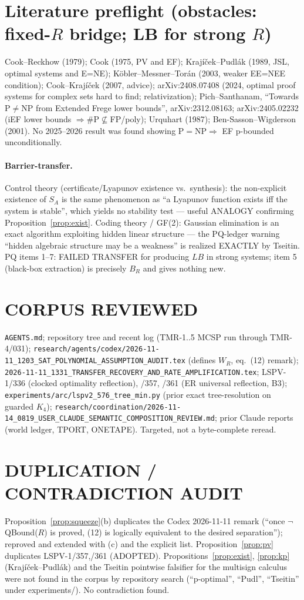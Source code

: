 \documentclass[11pt]{article}
\begin{document}
\section*{Literature preflight (obstacles: fixed-$R$ bridge; LB for strong $R$)}
Cook--Reckhow (1979); Cook (1975, PV and EF); Kraj\'i\v{c}ek--Pudl\'ak (1989, JSL, optimal systems
and E=NE); K\"obler--Messner--Tor\'an (2003, weaker EE=NEE condition); Cook--Kraj\'i\v{c}ek (2007, advice);
arXiv:2408.07408 (2024, optimal proof systems for complex sets hard to find; relativization);
Pich--Santhanam, ``Towards $\mathrm P\ne\mathrm{NP}$ from Extended Frege lower bounds'', arXiv:2312.08163;
arXiv:2405.02232 (iEF lower bounds $\Rightarrow\#$P$\not\subseteq$FP/poly); Urquhart (1987); Ben-Sasson--Wigderson (2001).
No 2025--2026 result was found showing $\mathrm P=\mathrm{NP}\Rightarrow$ EF p-bounded unconditionally.
\paragraph{Barrier-transfer.} Control theory (certificate/Lyapunov existence vs.\ synthesis): the
non-explicit existence of $S_A$ is the same phenomenon as ``a Lyapunov function exists iff the system is
stable'', which yields no stability test --- useful ANALOGY confirming Proposition~\ref{prop:exist}.
Coding theory / GF(2): Gaussian elimination is an exact algorithm exploiting hidden linear structure ---
the PQ-ledger warning ``hidden algebraic structure may be a weakness'' is realized EXACTLY by Tseitin.
PQ items 1--7: FAILED TRANSFER for producing $LB$ in strong systems; item 5 (black-box extraction) is
precisely $B_R$ and gives nothing new.

\section*{CORPUS REVIEWED}
\texttt{AGENTS.md}; repository tree and recent log (TMR-1..5 MCSP run through TMR-4/031);
\texttt{research/agents/codex/2026-11-11\_1203\_SAT\_POLYNOMIAL\_ASSUMPTION\_AUDIT.tex} (defines $W_R$,
eq.~(12) remark); \texttt{2026-11-11\_1331\_TRANSFER\_RECOVERY\_AND\_RATE\_AMPLIFICATION.tex};
LSPV-1/336 (clocked optimality reflection), /357, /361 (ER universal reflection, B3);
\texttt{experiments/arc/lspv2\_576\_tree\_min.py} (prior exact tree-resolution on guarded $K_4$);
\texttt{research/coordination/2026-11-14\_0819\_USER\_CLAUDE\_SEMANTIC\_COMPOSITION\_REVIEW.md};
prior Claude reports (world ledger, TPORT, ONETAPE). Targeted, not a byte-complete reread.
\section*{DUPLICATION / CONTRADICTION AUDIT}
Proposition~\ref{prop:squeeze}(b) duplicates the Codex 2026-11-11 remark (``once $\neg$QBound($R$) is proved,
(12) is logically equivalent to the desired separation''); reproved and extended with (c) and the explicit list.
Proposition~\ref{prop:pv} duplicates LSPV-1/357,/361 (ADOPTED). Propositions~\ref{prop:exist}, \ref{prop:kp}
(Kraj\'i\v{c}ek--Pudl\'ak) and the Tseitin pointwise falsifier for the multisign calculus were not found in the
corpus by repository search (``p-optimal'', ``Pudl'', ``Tseitin'' under experiments/). No contradiction found.
\end{document}

